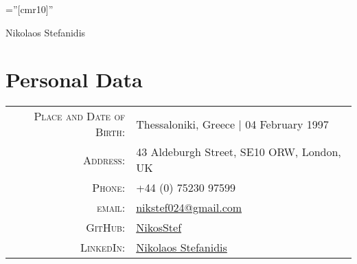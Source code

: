 \documentclass[a4paper,10pt]{article}
\begin{document}
\pagestyle{empty}

\font\fb=''[cmr10]''

\par{\centering
		{\Huge Nikolaos Stefanidis
	}\bigskip\par}

\section{Personal Data}

\begin{tabular}{rl}
    \textsc{Place and Date of Birth:} & Thessaloniki, Greece  | 04 February 1997 \\
    \textsc{Address:}   & 43 Aldeburgh Street, SE10 ORW, London, UK \\
    \textsc{Phone:}     & +44 (0) 75230 97599 \\
    \textsc{email:}     & \href{mailto:nikstef024@gmail.com}{nikstef024@gmail.com} \\
    \textsc{GitHub:}    & \href{https://github.com/NikosStef}{NikosStef} \\
    \textsc{LinkedIn:}  & \href{https://www.linkedin.com/in/nikolaos-stefanidis-b27aa711a/}{Nikolaos Stefanidis}
\end{tabular} \\ \\

\end{document}
